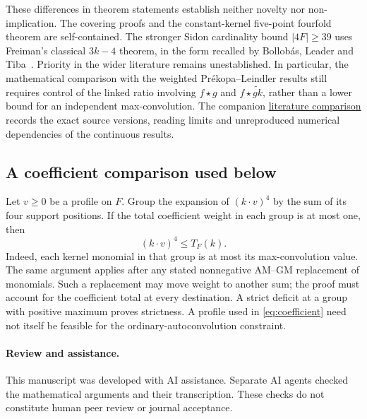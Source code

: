 \documentclass[11pt]{article}
\theoremstyle{remark}
\numberwithin{equation}{section}
\begin{document}
These differences in theorem statements establish neither novelty nor
non-implication. The covering proofs and the constant-kernel five-point
fourfold theorem are self-contained. The stronger Sidon cardinality
bound $|4F|\ge39$ uses Freiman's classical $3k-4$ theorem, in the form
recalled by Bollob\'as, Leader and Tiba~\cite[p.~1]{blt}.
Priority in the wider literature remains unestablished. In particular, the mathematical
comparison with the weighted Pr\'ekopa--Leindler results still requires
control of the linked ratio involving $f\star g$ and
$f\star\widetilde{gk}$, rather than a lower bound for an independent
max-convolution. The companion
\href{https://github.com/hraness/algal-lab/blob/main/papers/sumset-literature.md}
{literature comparison} records the exact source versions, reading limits
and unreproduced numerical dependencies of the continuous results.

\subsection{A coefficient comparison used below}
\label{sec:coefficient}
Let $v\ge0$ be a profile on $F$. Group the expansion of $(k\cdot v)^4$
by the sum of its four support positions. If the total coefficient weight
in each group is at most one, then
\begin{equation}\label{eq:coefficient}
 (k\cdot v)^4\le T_F(k).
\end{equation}
Indeed, each kernel monomial in that group is at most its max-convolution
value. The same argument applies after any stated nonnegative
AM--GM replacement of monomials. Such a replacement may move weight to
another sum; the proof must account for the coefficient total at every
destination. A strict deficit at a group with positive maximum proves
strictness. A profile used in \eqref{eq:coefficient} need not itself be
feasible for the ordinary-autoconvolution constraint.









\paragraph{Review and assistance.}
This manuscript was developed with AI assistance. Separate AI agents checked
the mathematical arguments and their transcription. These checks do not
constitute human peer review or journal acceptance.
\end{document}
